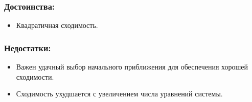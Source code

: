 \subsubsection{Достоинства:}
\begin{itemize}
    \item Квадратичная сходимость.
\end{itemize}
\subsubsection{Недостатки:}
\begin{itemize}
    \item Важен удачный выбор начального приближения для обеспечения хорошей сходимости.
    \item Сходимость ухудшается с увеличением числа уравнений системы.
\end{itemize}